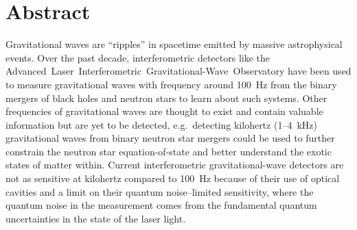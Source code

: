 \chapter*{Abstract}


Gravitational waves are ``ripples'' in spacetime emitted by massive astrophysical events. %
Over the past decade, interferometric detectors like the Advanced~Laser~Interferometric~Gravitational-Wave~Observatory have been used to measure gravitational waves with frequency around 100~Hz from the binary mergers of black holes and neutron stars to learn about such systems.
Other frequencies of gravitational waves are thought to exist and contain valuable information but are yet to be detected, e.g.\ detecting kilohertz (1--4~kHz) gravitational waves from binary neutron star mergers could be used to further constrain the neutron star equation-of-state and better understand the exotic states of matter within.
Current interferometric gravitational-wave detectors are not as sensitive at kilohertz compared to 100~Hz because of their use of optical cavities  and a limit on their quantum noise--limited sensitivity, where the quantum noise in the measurement comes from the fundamental quantum uncertainties in the state of the laser light.

